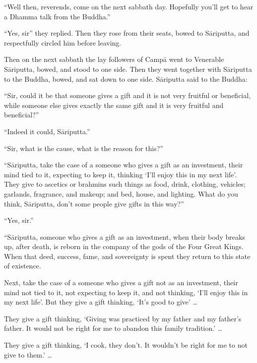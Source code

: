 \documentclass[12pt,openany]{book}%
\begin{document}
“Well then, reverends, come on the next sabbath day. Hopefully you’ll get to hear a Dhamma talk from the Buddha.” 

“Yes, sir” they replied. Then they rose from their seats, bowed to \textsanskrit{Sāriputta}, and respectfully circled him before leaving. 

Then on the next sabbath the lay followers of \textsanskrit{Campā} went to Venerable \textsanskrit{Sāriputta}, bowed, and stood to one side. Then they went together with \textsanskrit{Sāriputta} to the Buddha, bowed, and sat down to one side. \textsanskrit{Sāriputta} said to the Buddha: 

“Sir, could it be that someone gives a gift and it is not very fruitful or beneficial, while someone else gives exactly the same gift and it is very fruitful and beneficial?” 

“Indeed it could, \textsanskrit{Sāriputta}.” 

“Sir, what is the cause, what is the reason for this?” 

“\textsanskrit{Sāriputta}, take the case of a someone who gives a gift as an investment, their mind tied to it, expecting to keep it, thinking ‘I’ll enjoy this in my next life’. They give to ascetics or brahmins such things as food, drink, clothing, vehicles; garlands, fragrance, and makeup; and bed, house, and lighting. What do you think, \textsanskrit{Sāriputta}, don’t some people give gifts in this way?” 

“Yes, sir.” 

“\textsanskrit{Sāriputta}, someone who gives a gift as an investment, when their body breaks up, after death, is reborn in the company of the gods of the Four Great Kings. When that deed, success, fame, and sovereignty is spent they return to this state of existence. 

Next, take the case of a someone who gives a gift not as an investment, their mind not tied to it, not expecting to keep it, and not thinking, ‘I’ll enjoy this in my next life’. But they give a gift thinking, ‘It’s good to give’ … 

They give a gift thinking, ‘Giving was practiced by my father and my father’s father. It would not be right for me to abandon this family tradition.’ … 

They give a gift thinking, ‘I cook, they don’t. It wouldn’t be right for me to not give to them.’ … 
\end{document}
